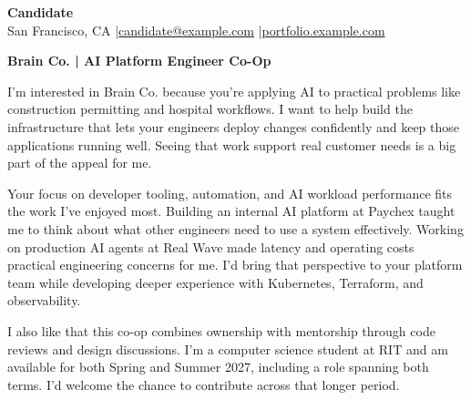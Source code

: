\documentclass[11pt,letterpaper]{article}
\begin{document}
\raggedright
{\Large\textbf{Candidate}}\\[4pt]
San Francisco, CA \enspace|\enspace \href{mailto:candidate@example.com}{candidate@example.com} \enspace|\enspace \href{https://portfolio.example.com}{portfolio.example.com}

\vspace{5pt}
\textbf{Brain Co. | AI Platform Engineer Co-Op}

I'm interested in Brain Co. because you're applying AI to practical problems like construction permitting and hospital workflows. I want to help build the infrastructure that lets your engineers deploy changes confidently and keep those applications running well. Seeing that work support real customer needs is a big part of the appeal for me.

Your focus on developer tooling, automation, and AI workload performance fits the work I've enjoyed most. Building an internal AI platform at Paychex taught me to think about what other engineers need to use a system effectively. Working on production AI agents at Real Wave made latency and operating costs practical engineering concerns for me. I'd bring that perspective to your platform team while developing deeper experience with Kubernetes, Terraform, and observability.

I also like that this co-op combines ownership with mentorship through code reviews and design discussions. I'm a computer science student at RIT and am available for both Spring and Summer 2027, including a role spanning both terms. I'd welcome the chance to contribute across that longer period.
\end{document}
